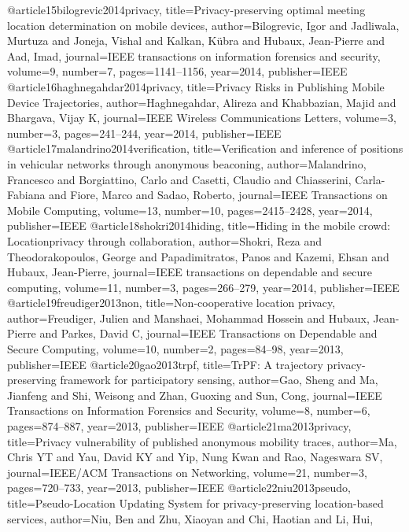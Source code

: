 {{{{{{@article{15bilogrevic2014privacy,
	title={Privacy-preserving optimal meeting location determination on mobile devices},
	author={Bilogrevic, Igor and Jadliwala, Murtuza and Joneja, Vishal and Kalkan, K{\"u}bra and Hubaux, Jean-Pierre and Aad, Imad},
	journal={IEEE transactions on information forensics and security},
	volume={9},
	number={7},
	pages={1141--1156},
	year={2014},
	publisher={IEEE}
}
@article{16haghnegahdar2014privacy,
	title={Privacy Risks in Publishing Mobile Device Trajectories},
	author={Haghnegahdar, Alireza and Khabbazian, Majid and Bhargava, Vijay K},
	journal={IEEE Wireless Communications Letters},
	volume={3},
	number={3},
	pages={241--244},
	year={2014},
	publisher={IEEE}
}
@article{17malandrino2014verification,
	title={Verification and inference of positions in vehicular networks through anonymous beaconing},
	author={Malandrino, Francesco and Borgiattino, Carlo and Casetti, Claudio and Chiasserini, Carla-Fabiana and Fiore, Marco and Sadao, Roberto},
	journal={IEEE Transactions on Mobile Computing},
	volume={13},
	number={10},
	pages={2415--2428},
	year={2014},
	publisher={IEEE}
}
@article{18shokri2014hiding,
	title={Hiding in the mobile crowd: Locationprivacy through collaboration},
	author={Shokri, Reza and Theodorakopoulos, George and Papadimitratos, Panos and Kazemi, Ehsan and Hubaux, Jean-Pierre},
	journal={IEEE transactions on dependable and secure computing},
	volume={11},
	number={3},
	pages={266--279},
	year={2014},
	publisher={IEEE}
}
@article{19freudiger2013non,
	title={Non-cooperative location privacy},
	author={Freudiger, Julien and Manshaei, Mohammad Hossein and Hubaux, Jean-Pierre and Parkes, David C},
	journal={IEEE Transactions on Dependable and Secure Computing},
	volume={10},
	number={2},
	pages={84--98},
	year={2013},
	publisher={IEEE}
}
@article{20gao2013trpf,
	title={TrPF: A trajectory privacy-preserving framework for participatory sensing},
	author={Gao, Sheng and Ma, Jianfeng and Shi, Weisong and Zhan, Guoxing and Sun, Cong},
	journal={IEEE Transactions on Information Forensics and Security},
	volume={8},
	number={6},
	pages={874--887},
	year={2013},
	publisher={IEEE}
}
@article{21ma2013privacy,
	title={Privacy vulnerability of published anonymous mobility traces},
	author={Ma, Chris YT and Yau, David KY and Yip, Nung Kwan and Rao, Nageswara SV},
	journal={IEEE/ACM Transactions on Networking},
	volume={21},
	number={3},
	pages={720--733},
	year={2013},
	publisher={IEEE}
}
@article{22niu2013pseudo,
	title={Pseudo-Location Updating System for privacy-preserving location-based services},
	author={Niu, Ben and Zhu, Xiaoyan and Chi, Haotian and Li, Hui},
}}}}}}}
